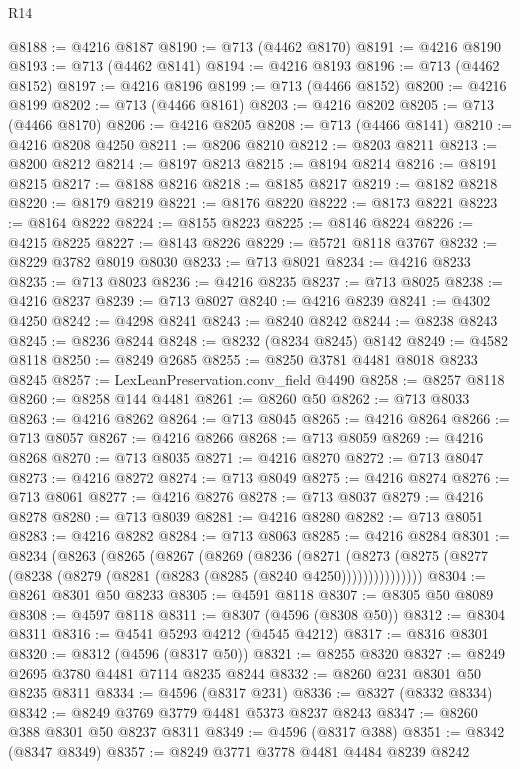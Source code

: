 \begin{lexlean}{R14}
\begin{coremodule}
@8188 := @4216 @8187
@8190 := @713 (@4462 @8170)
@8191 := @4216 @8190
@8193 := @713 (@4462 @8141)
@8194 := @4216 @8193
@8196 := @713 (@4462 @8152)
@8197 := @4216 @8196
@8199 := @713 (@4466 @8152)
@8200 := @4216 @8199
@8202 := @713 (@4466 @8161)
@8203 := @4216 @8202
@8205 := @713 (@4466 @8170)
@8206 := @4216 @8205
@8208 := @713 (@4466 @8141)
@8210 := @4216 @8208 @4250
@8211 := @8206 @8210
@8212 := @8203 @8211
@8213 := @8200 @8212
@8214 := @8197 @8213
@8215 := @8194 @8214
@8216 := @8191 @8215
@8217 := @8188 @8216
@8218 := @8185 @8217
@8219 := @8182 @8218
@8220 := @8179 @8219
@8221 := @8176 @8220
@8222 := @8173 @8221
@8223 := @8164 @8222
@8224 := @8155 @8223
@8225 := @8146 @8224
@8226 := @4215 @8225
@8227 := @8143 @8226
@8229 := @5721 @8118 @3767
@8232 := @8229 @3782 @8019 @8030
@8233 := @713 @8021
@8234 := @4216 @8233
@8235 := @713 @8023
@8236 := @4216 @8235
@8237 := @713 @8025
@8238 := @4216 @8237
@8239 := @713 @8027
@8240 := @4216 @8239
@8241 := @4302 @4250
@8242 := @4298 @8241
@8243 := @8240 @8242
@8244 := @8238 @8243
@8245 := @8236 @8244
@8248 := @8232 (@8234 @8245) @8142
@8249 := @4582 @8118
@8250 := @8249 @2685
@8255 := @8250 @3781 @4481 @8018 @8233 @8245
@8257 := LexLeanPreservation.conv_field @4490
@8258 := @8257 @8118
@8260 := @8258 @144 @4481
@8261 := @8260 @50
@8262 := @713 @8033
@8263 := @4216 @8262
@8264 := @713 @8045
@8265 := @4216 @8264
@8266 := @713 @8057
@8267 := @4216 @8266
@8268 := @713 @8059
@8269 := @4216 @8268
@8270 := @713 @8035
@8271 := @4216 @8270
@8272 := @713 @8047
@8273 := @4216 @8272
@8274 := @713 @8049
@8275 := @4216 @8274
@8276 := @713 @8061
@8277 := @4216 @8276
@8278 := @713 @8037
@8279 := @4216 @8278
@8280 := @713 @8039
@8281 := @4216 @8280
@8282 := @713 @8051
@8283 := @4216 @8282
@8284 := @713 @8063
@8285 := @4216 @8284
@8301 := @8234
    (@8263
      (@8265
        (@8267
          (@8269
            (@8236
              (@8271
                (@8273 (@8275 (@8277 (@8238 (@8279 (@8281 (@8283 (@8285 (@8240 @4250)))))))))))))))
@8304 := @8261 @8301 @50 @8233
@8305 := @4591 @8118
@8307 := @8305 @50 @8089
@8308 := @4597 @8118
@8311 := @8307 (@4596 (@8308 @50))
@8312 := @8304 @8311
@8316 := @4541 @5293 @4212 (@4545 @4212)
@8317 := @8316 @8301
@8320 := @8312 (@4596 (@8317 @50))
@8321 := @8255 @8320
@8327 := @8249 @2695 @3780 @4481 @7114 @8235 @8244
@8332 := @8260 @231 @8301 @50 @8235 @8311
@8334 := @4596 (@8317 @231)
@8336 := @8327 (@8332 @8334)
@8342 := @8249 @3769 @3779 @4481 @5373 @8237 @8243
@8347 := @8260 @388 @8301 @50 @8237 @8311
@8349 := @4596 (@8317 @388)
@8351 := @8342 (@8347 @8349)
@8357 := @8249 @3771 @3778 @4481 @4484 @8239 @8242

\end{coremodule}
\end{lexlean}

